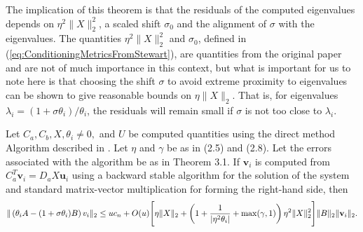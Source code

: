 The implication of this theorem is that the residuals of the computed eigenvalues depends on $\eta^2 \| X \|_2^2$, a scaled shift $\sigma_0$ and the alignment of $\sigma$ with the eigenvalues. The quantities $\eta^2 \| X \|_2^2$ and  $\sigma_0$, defined in (\ref{eq:ConditioningMetricsFromStewart}), are quantities from the original paper and are not of much importance in this context, but what is important for us to note here is that choosing the shift $\sigma$ to avoid extreme proximity to eigenvalues can be shown to give reasonable bounds on $\eta \|X\|_2$. That is, for eigenvalues $\lambda_i = (1 + \sigma \theta_i)/ \theta_i$, the residuals will remain small if $\sigma$ is not too close to $\lambda_i$.

\begin{lemma}\label{lemma:ResidualBoundsEigenvectors}
		Let $C_a, C_b, X, \theta_i \neq 0,$ and $U$ be computed quantities using the direct method Algorithm described in \cite{stewart2024spectraltransformationdensesymmetric}. Let $\eta$ and $\gamma$ be as in (2.5) and (2.8). Let the errors associated with the algorithm be as in Theorem 3.1. If $\mathbf{v}_i$ is computed from $C_a^T \mathbf{v}_i = D_a X \mathbf{u}_i$ using a backward stable algorithm for the solution of the system and standard matrix-vector multiplication for forming the right-hand side, then
		\[
		\| \left( \theta_i A - (1 + \sigma \theta_i) B \right) v_i \|_2 \leq u c_n + O(u) \Bigg[ \eta \| X \|_2 \\
		+ \left( 1 + \frac{1}{| \eta^2 \theta_i |} + \max(\gamma, 1) \right) \eta^2 \| X \|_2^2 \Bigg] \| B \|_2 \| \mathbf{v}_i \|_2.\]
\end{lemma}


